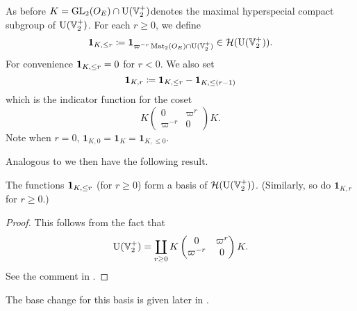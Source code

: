 As before $K = \operatorname{GL}_2(O_E) \cap \operatorname{U}(\mathbb V_2^+)$denotes the maximal hyperspecial compact subgroup of $\operatorname{U}(\mathbb V_2^+)$.
For each $r \ge 0$, we define
\[ \mathbf{1}_{K, \le r} \coloneqq \mathbf{1}_{\varpi^{-r} \operatorname{Mat}_2(O_E) \cap \operatorname{U}(\mathbb V_2^+)} \in \mathcal H(\operatorname{U}(\mathbb V_2^+)). \]
For convenience $\mathbf{1}_{K, \le r} = 0$ for $r < 0$.
We also set
\[  \mathbf{1}_{K, r} \coloneqq \mathbf{1}_{K, \le r} - \mathbf{1}_{K, \le (r-1)} \]
which is the indicator function for the coset
\[ K \begin{pmatrix} 0 & \varpi^r \\ \varpi^{-r} & 0 \end{pmatrix} K. \]
Note when $r = 0$, $\mathbf{1}_{K, 0} = \mathbf{1}_K = \mathbf{1}_{K, \le 0}$.

Analogous to  we then have the following result.
\begin{proposition}
  The functions $\mathbf{1}_{K, \le r}$ (for $r \ge 0$) form a basis of $\mathcal H(\operatorname{U}(\mathbb V_2^+))$.
  (Similarly, so do $\mathbf{1}_{K, r}$ for $r \ge 0$.)
\end{proposition}
\begin{proof}
  This follows from the fact that
  \[ \operatorname{U}(\mathbb V_2^+) = \coprod_{r \ge 0}
    K \begin{pmatrix} 0 & \varpi^r \\ \varpi^{-r} & 0 \end{pmatrix} K. \]
  See the comment in \cite[Equation (7.1.5)]{ref:AFLspherical}.
\end{proof}

The base change for this basis is given later in .

